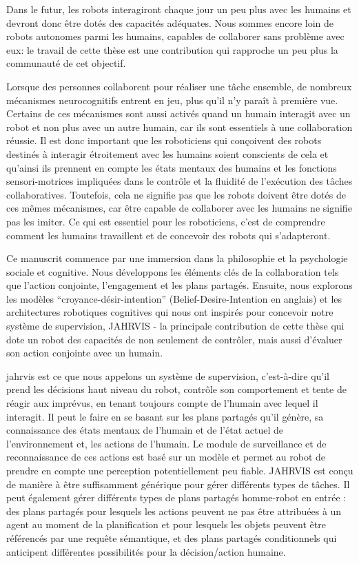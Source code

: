 \documentclass[english,a4paper,11pt,twoside]{StyleThese}
\begin{document}
Dans le futur, les robots interagiront chaque jour un peu plus avec les humains et devront donc être dotés des capacités adéquates. Nous sommes encore loin de robots autonomes parmi les humains, capables de collaborer sans problème avec eux: le travail de cette thèse est une contribution qui rapproche un peu plus la communauté de cet objectif. 


Lorsque des personnes collaborent pour réaliser une tâche ensemble, de nombreux mécanismes neurocognitifs entrent en jeu, plus qu’il n’y paraît à première vue. Certains de ces mécanismes sont aussi activés quand un humain interagit avec un robot et non plus avec un autre humain, car ils sont essentiels à une collaboration réussie. Il est donc important que les roboticiens qui conçoivent des robots destinés à interagir étroitement avec les humains soient conscients de cela et qu’ainsi ils prennent en compte les états mentaux des humains et les fonctions sensori-motrices impliquées dans le contrôle et la fluidité de l'exécution des tâches collaboratives. Toutefois, cela ne signifie pas que les robots doivent être dotés de ces mêmes mécanismes, car être capable de collaborer avec les humains ne signifie pas les imiter. Ce qui est essentiel pour les roboticiens, c'est de comprendre comment les humains travaillent et de concevoir des robots qui s'adapteront. 


Ce manuscrit commence par une immersion dans la philosophie et la psychologie sociale et cognitive. Nous développons les éléments clés de la collaboration tels que l'action conjointe, l'engagement et les plans partagés. Ensuite, nous explorons les modèles “croyance-désir-intention” (Belief-Desire-Intention en anglais) et les architectures robotiques cognitives qui nous ont inspirés pour concevoir notre système de supervision, JAHRVIS - la principale contribution de cette thèse qui dote un robot des capacités de non seulement de contrôler, mais aussi d'évaluer son action conjointe avec un humain. 


\acrfull{jahrvis} est ce que nous appelons un système de supervision, c'est-à-dire qu'il prend les décisions haut niveau du robot, contrôle son comportement et tente de réagir aux imprévus, en tenant toujours compte de l'humain avec lequel il interagit. Il peut le faire en se basant sur les plans partagés qu’il génère, sa connaissance des états mentaux de l'humain et de l'état actuel de l'environnement et, les actions de l'humain. Le module de surveillance et de reconnaissance de ces actions est basé sur un modèle et permet au robot de prendre en compte une perception potentiellement peu fiable. JAHRVIS est conçu de manière à être suffisamment générique pour gérer différents types de tâches. Il peut également gérer différents types de plans partagés homme-robot en entrée : des plans partagés pour lesquels les actions peuvent ne pas être attribuées à un agent au moment de la planification et pour lesquels les objets peuvent être référencés par une requête sémantique, et des plans partagés conditionnels qui anticipent différentes possibilités pour la décision/action humaine. 
\end{document}
